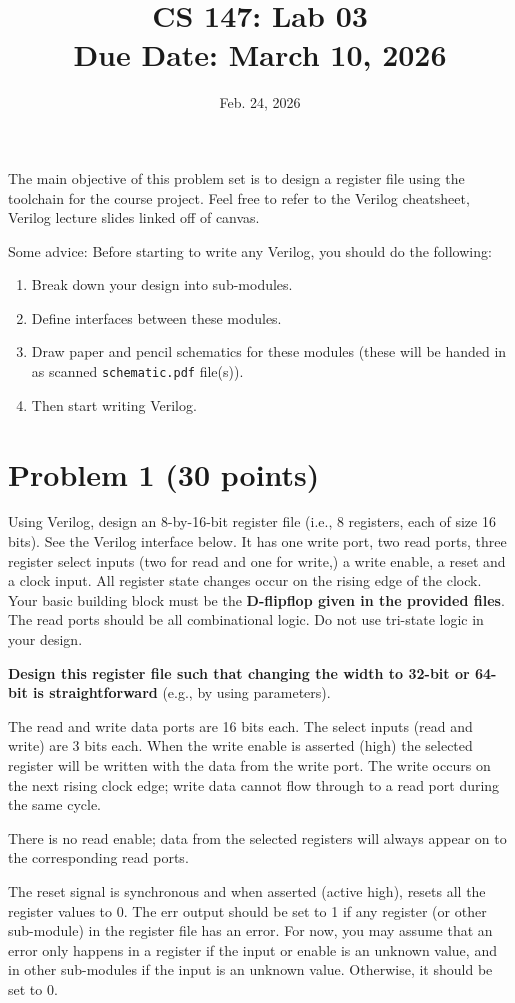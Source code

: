 \documentclass[12pt]{article}
\title{CS 147: Lab 03 \\ Due Date: March 10, 2026}
\author{}
\date{Feb. 24, 2026}
\begin{document}
\maketitle
The main objective of this problem set is to design a register file using the toolchain for the course project.  
Feel free to refer
to the Verilog cheatsheet, Verilog lecture slides linked off of canvas. 

Some advice: Before starting to write any Verilog, you should do the following:
\begin{enumerate}
\item
Break down your design into sub-modules.
\item Define interfaces between these modules.
\item Draw paper and pencil schematics for these modules (these will be handed in as scanned
\texttt{schematic.pdf} file(s)).
\item Then start writing Verilog.
\end{enumerate}

\section*{Problem 1 (30 points)}
Using Verilog, design an 8-by-16-bit register file (i.e., 8 registers, each of size 16 bits). See the Verilog
interface below. It has one write port, two read ports, three register select inputs (two for read and one for
write,) a write enable, a reset and a clock input. All register state changes occur on the rising edge of the
clock. Your basic building block must be the \textbf{D-flipflop given in the provided files}. The read ports should
be all combinational logic. Do not use tri-state logic in your design.

\textbf{Design this register file such that changing the width to 32-bit or 64-bit is straightforward} (e.g., by
using parameters).

The read and write data ports are 16 bits each. The select inputs (read and write) are 3 bits each. When the
write enable is asserted (high) the selected register will be written with the data from the write port. The
write occurs on the next rising clock edge; write data cannot flow through to a read port during the same
cycle.

There is no read enable; data from the selected registers will always appear on to the corresponding read
ports.

The reset signal is synchronous and when asserted (active high), resets all the register values to 0.
The err output should be set to 1 if any register (or other sub-module) in the register file has an error. For
now, you may assume that an error only happens in a register if the input or enable is an unknown value,
and in other sub-modules if the input is an unknown value. Otherwise, it should be set to 0.
\end{document}
